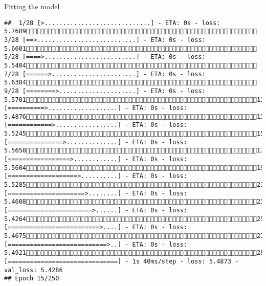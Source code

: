 \documentclass[
  ignorenonframetext,
]{beamer}
\begin{document}
\begin{frame}[fragile]{Fitting the model}
\begin{verbatim}
##  1/28 [>.............................] - ETA: 0s - loss: 5.7689 3/28 [==>...........................] - ETA: 0s - loss: 5.6601 5/28 [====>.........................] - ETA: 0s - loss: 5.5404 7/28 [======>.......................] - ETA: 0s - loss: 5.6384 9/28 [========>.....................] - ETA: 0s - loss: 5.570111/28 [==========>...................] - ETA: 0s - loss: 5.487613/28 [============>.................] - ETA: 0s - loss: 5.524515/28 [===============>..............] - ETA: 0s - loss: 5.565817/28 [=================>............] - ETA: 0s - loss: 5.560419/28 [===================>..........] - ETA: 0s - loss: 5.528521/28 [=====================>........] - ETA: 0s - loss: 5.460823/28 [=======================>......] - ETA: 0s - loss: 5.426425/28 [=========================>....] - ETA: 0s - loss: 5.467527/28 [===========================>..] - ETA: 0s - loss: 5.492128/28 [==============================] - 1s 40ms/step - loss: 5.4873 - val_loss: 5.4286
## Epoch 15/250

\end{verbatim}
\end{frame}
\end{document}
